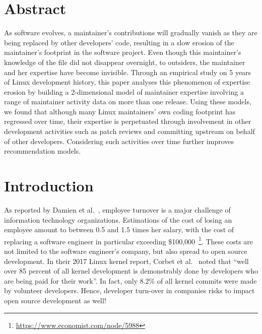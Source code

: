 \label{sec:Theme3}

\section{Abstract}

As software evolves, a maintainer's contributions will gradually vanish as they are being replaced by other developers' code, resulting in a slow erosion of the maintainer's footprint in the software project. Even though this maintainer's knowledge of the file did not disappear overnight, to outsiders, the maintainer and her expertise have become invisible. Through an empirical study on 5 years of Linux development history, this paper analyses this phenomenon of expertise erosion by building a 2-dimensional model of maintainer expertise involving a range of maintainer activity data on more than one release. Using these models, we found that although many Linux maintainers' own coding footprint has regressed over time, their expertise is perpetuated through involvement in other development activities such as patch reviews and committing upstream on behalf of other developers. Considering such activities over time further improves recommendation models.


\section{Introduction}

As reported by Damien et al.~\cite{turnover}, employee turnover is a major challenge of information technology organizations. Estimations of the cost of losing an employee amount to between 0.5 and 1.5 times her salary, with the cost of replacing a software engineer in particular exceeding \$100,000~\footnote{\url{https://www.economist.com/node/5988}}. These costs are not limited to the software engineer's company, but also spread to open source development. In their 2017 Linux kernel report, Corbet et al.~\cite{corbet17} noted that ``well over 85 percent of all kernel development is demonstrably done by developers who are being paid for their work''. In fact, only 8.2\% of all kernel commits were made by volunteer developers. Hence, developer turn-over in companies risks to impact open source development as well!



